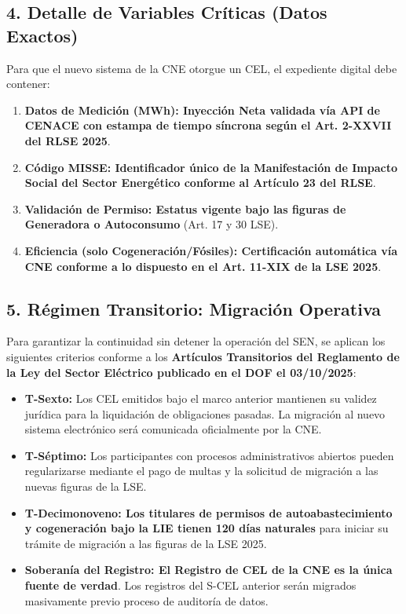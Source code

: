 \documentclass{cel}
\begin{document}
\subsection{4. Detalle de Variables Críticas (Datos Exactos)}
\nopagebreak

Para que el nuevo sistema de la CNE otorgue un CEL, el expediente digital debe contener:


\begin{enumerate}
\item \textbf{Datos de Medición (MWh): \textbf{ Inyección Neta validada vía API de CENACE con estampa de tiempo síncrona según el }Art. 2-XXVII del RLSE 2025}.
\item \textbf{Código MISSE: \textbf{ Identificador único de la }Manifestación de Impacto Social del Sector Energético \textbf{ conforme al }Artículo 23 del RLSE}.
\item \textbf{Validación de Permiso: \textbf{ Estatus vigente bajo las figuras de }Generadora \textbf{ o }Autoconsumo} (Art. 17 y 30 LSE).
\item \textbf{Eficiencia (solo Cogeneración/Fósiles): \textbf{ Certificación automática vía CNE conforme a lo dispuesto en el }Art. 11-XIX de la LSE 2025}.


\end{enumerate}
\subsection{5. Régimen Transitorio: Migración Operativa}
\nopagebreak

Para garantizar la continuidad sin detener la operación del SEN, se aplican los siguientes criterios conforme a los \textbf{Artículos Transitorios del Reglamento de la Ley del Sector Eléctrico publicado en el DOF el 03/10/2025}:


\begin{itemize}
\item \textbf{T-Sexto:} Los CEL emitidos bajo el marco anterior mantienen su validez jurídica para la liquidación de obligaciones pasadas. La migración al nuevo sistema electrónico será comunicada oficialmente por la CNE.
\item \textbf{T-Séptimo:} Los participantes con procesos administrativos abiertos pueden regularizarse mediante el pago de multas y la solicitud de migración a las nuevas figuras de la LSE.
\item \textbf{T-Decimonoveno: \textbf{ Los titulares de permisos de autoabastecimiento y cogeneración bajo la LIE tienen }120 días naturales} para iniciar su trámite de migración a las figuras de la LSE 2025.
\item \textbf{Soberanía del Registro: \textbf{ El Registro de CEL de la CNE es la }única fuente de verdad}. Los registros del S-CEL anterior serán migrados masivamente previo proceso de auditoría de datos.

\end{itemize}
{}
\end{document}
